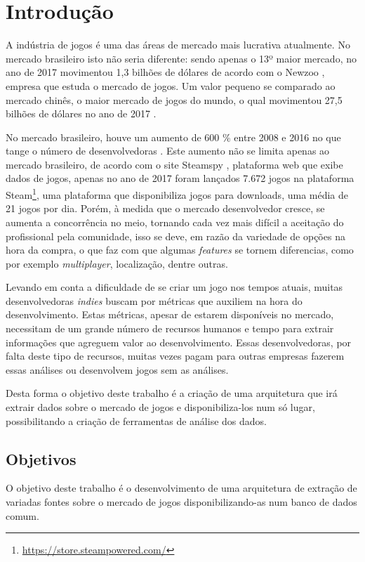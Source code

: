 \chapter*[Introdução]{Introdução}
A indústria de jogos é uma das áreas de mercado mais lucrativa atualmente. No mercado brasileiro isto não seria diferente: sendo apenas o 13º maior mercado, no ano de 2017 movimentou 1,3 bilhões de dólares de acordo com o Newzoo \cite{newzoo_brasil}, empresa que estuda o mercado de jogos. Um valor pequeno se comparado ao mercado chinês, o maior mercado de jogos do mundo, o qual movimentou 27,5 bilhões de dólares no ano de 2017 \cite{newzoo_china}.

No mercado brasileiro, houve um aumento de 600 \% entre 2008 e 2016 no que tange o número de desenvolvedoras \cite{desenvolvedoras_crescimento}. Este aumento não se limita apenas ao mercado brasileiro, de acordo com o site Steamspy \cite{steam_spy}, plataforma web que exibe dados de jogos, apenas no ano de 2017 foram lançados 7.672 jogos na plataforma Steam\footnote[1]{\url{https://store.steampowered.com/}}, uma plataforma que disponibiliza jogos para downloads, uma média de 21 jogos por dia. Porém, à medida que o mercado desenvolvedor cresce, se aumenta a concorrência no meio, tornando cada vez mais difícil a aceitação do profissional pela comunidade, isso se deve, em razão da variedade de opções na hora da compra, o que faz com que algumas \textit{features} se tornem diferencias, como por exemplo \textit{multiplayer}, localização, dentre outras.

Levando em conta a dificuldade de se criar um jogo nos tempos atuais, muitas desenvolvedoras \textit{indies} buscam por métricas que auxiliem na hora do desenvolvimento. Estas métricas, apesar de estarem disponíveis no mercado, necessitam de um grande número de recursos humanos e tempo para extrair informações que agreguem valor ao desenvolvimento. Essas desenvolvedoras, por falta deste tipo de recursos, muitas vezes pagam para outras empresas fazerem essas análises ou desenvolvem jogos sem as análises.

Desta forma o objetivo deste trabalho é a criação de uma arquitetura que irá extrair dados sobre o mercado de jogos e disponibiliza-los num só lugar, possibilitando a criação de ferramentas de análise dos dados.

\section*{Objetivos}
	O objetivo deste trabalho é o desenvolvimento de uma arquitetura de extração de variadas fontes sobre o mercado de jogos disponibilizando-as num banco de dados comum.
	
